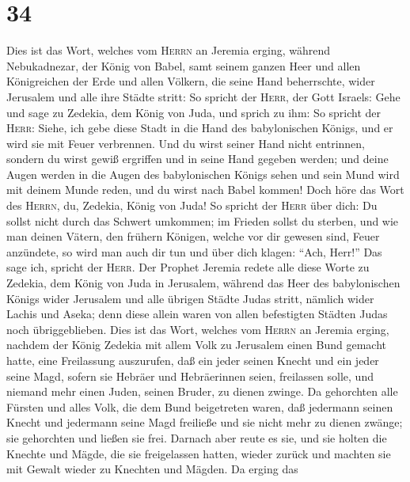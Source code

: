 \hypertarget{section-33}{%
\section{34}\label{section-33}}

 Dies ist das Wort, welches vom \textsc{Herrn} an Jeremia
erging, während Nebukadnezar, der König von Babel, samt seinem ganzen
Heer und allen Königreichen der Erde und allen Völkern, die seine Hand
beherrschte, wider Jerusalem und alle ihre Städte stritt: 
So spricht der \textsc{Herr}, der Gott Israels: Gehe und sage zu
Zedekia, dem König von Juda, und sprich zu ihm: So spricht der
\textsc{Herr}: Siehe, ich gebe diese Stadt in die Hand des babylonischen
Königs, und er wird sie mit Feuer verbrennen.  Und du
wirst seiner Hand nicht entrinnen, sondern du wirst gewiß ergriffen und
in seine Hand gegeben werden; und deine Augen werden in die Augen des
babylonischen Königs sehen und sein Mund wird mit deinem Munde reden,
und du wirst nach Babel kommen!  Doch höre das Wort des
\textsc{Herrn}, du, Zedekia, König von Juda! So spricht der
\textsc{Herr} über dich: Du sollst nicht durch das Schwert umkommen;
 im Frieden sollst du sterben, und wie man deinen Vätern,
den frühern Königen, welche vor dir gewesen sind, Feuer anzündete, so
wird man auch dir tun und über dich klagen: ``Ach, Herr!''
 Das sage ich, spricht der \textsc{Herr}. Der Prophet
Jeremia redete alle diese Worte zu Zedekia, dem König von Juda in
Jerusalem, während das Heer des babylonischen Königs wider Jerusalem und
alle übrigen Städte Judas stritt, nämlich wider Lachis und Aseka;
 denn diese allein waren von allen befestigten Städten
Judas noch übriggeblieben.  Dies ist das Wort, welches vom
\textsc{Herrn} an Jeremia erging, nachdem der König Zedekia mit allem
Volk zu Jerusalem einen Bund gemacht hatte, eine Freilassung auszurufen,
 daß ein jeder seinen Knecht und ein jeder seine Magd,
sofern sie Hebräer und Hebräerinnen seien, freilassen solle, und niemand
mehr einen Juden, seinen Bruder, zu dienen zwinge.  Da
gehorchten alle Fürsten und alles Volk, die dem Bund beigetreten waren,
daß jedermann seinen Knecht und jedermann seine Magd freiließe und sie
nicht mehr zu dienen zwänge; sie gehorchten und ließen sie frei.
 Darnach aber reute es sie, und sie holten die Knechte
und Mägde, die sie freigelassen hatten, wieder zurück und machten sie
mit Gewalt wieder zu Knechten und Mägden.  Da erging das
